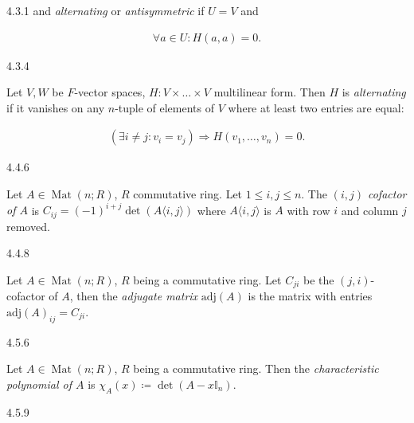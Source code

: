 \documentclass[10pt]{article} %
\renewcommand{\leq}{\leqslant}
\DeclareMathOperator{\Mat}{Mat}
\begin{document}
\begin{multicols}{3}
\begin{definition}{4.3.1}{}
    and \emph{alternating} or \emph{antisymmetric} if $U = V$ and

        \begin{align*}
            \forall a \in U: H(a,a) = 0.
        \end{align*}
    
\end{definition}

\begin{definition}{4.3.4}{}

    Let $V, W$ be $F$-vector spaces, $H: V \times \hdots \times V$ multilinear form. Then $H$ is \emph{alternating} if it vanishes on any $n$-tuple of elements of $V$ where at least two entries are equal:

        \begin{align*}
            (\exists i \neq j: v_i = v_j) \Rightarrow H(v_1, \hdots, v_n) = 0.
        \end{align*}

\end{definition}

\begin{definition}{4.4.6}{}

    Let $A \in \Mat(n;R)$, $R$ commutative ring. Let $1 \leq i,j \leq n$. The \emph{$(i,j)$ cofactor of $A$} is $C_{ij} = (-1)^{i+j}\det{(A\langle i,j \rangle)}$ where $A\langle i,j \rangle$ is $A$ with row $i$ and column $j$ removed.

\end{definition}

\begin{definition}{4.4.8}{}

    Let $A \in \Mat(n;R)$, $R$ being a commutative ring. Let $C_{ji}$ be the $(j,i)$-cofactor of $A$, then the \emph{adjugate matrix} $\mathrm{adj}(A)$ is the matrix with entries $\mathrm{adj}(A)_{ij} = C_{ji}$.

\end{definition}

\begin{definition}{4.5.6}{}

    Let $A \in \Mat(n;R)$, $R$ being a commutative ring. Then the \emph{characteristic polynomial of $A$} is $\chi_A(x) \coloneqq \det{(A - x\mathbb{I}_n)} $.

\end{definition}

\begin{definition}{4.5.9}{}


\end{definition}
\end{multicols}
\end{document}
